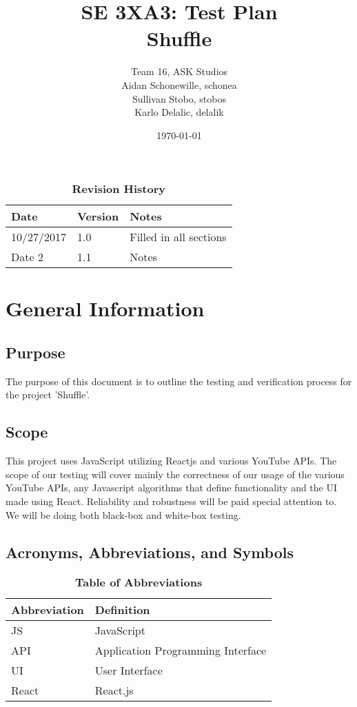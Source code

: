 \documentclass[12pt, titlepage]{article}
\title{SE 3XA3: Test Plan\\Shuffle}
\author{Team 16, ASK Studios
		\\ Aidan Schonewille, schonea
		\\ Sullivan Stobo, stobos
		\\ Karlo Delalic, delalik
}
\date{\today}
\begin{document}
\maketitle

\tableofcontents
\listoftables

\begin{table}[bp]
\caption{\bf Revision History}
\begin{tabularx}{\textwidth}{p{3cm}p{2cm}X}
\toprule {\bf Date} & {\bf Version} & {\bf Notes}\\
\midrule
10/27/2017 & 1.0 & Filled in all sections\\
Date 2 & 1.1 & Notes\\
\bottomrule
\end{tabularx}
\end{table}

\newpage


\section{General Information}

\subsection{Purpose}

The purpose of this document is to outline the testing and verification process for the project 'Shuffle'.

\subsection{Scope}

This project uses JavaScript utilizing Reactjs and various YouTube APIs.  The scope of our testing will cover mainly the correctness of our usage of the various YouTube APIs, any Javascript algorithms that define functionality and the UI made using React.  Reliability and robustness will be paid special attention to.  We will be doing both black-box and white-box testing.

\subsection{Acronyms, Abbreviations, and Symbols}
	
\begin{table}[hbp]
\caption{\textbf{Table of Abbreviations}} \label{Table}

\begin{tabularx}{\textwidth}{p{3cm}X}
\toprule
\textbf{Abbreviation} & \textbf{Definition} \\
\midrule
JS & JavaScript\\
API & Application Programming Interface\\
UI & User Interface\\
React & React.js\\
\bottomrule
\end{tabularx}

\end{table}
\end{document}
